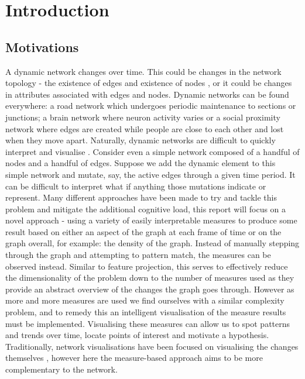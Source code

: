 
\chapter{Introduction}
\label{chap:introduction}
\ifpdf
    \graphicspath{{Introduction/Figures/PNG/}{Introduction/Figures/PDF/}{Introduction/Figures/}}
\else
    \graphicspath{{Introduction/Figures/EPS/}{Introduction/Figures/}}
\fi




\section{Motivations}
\label{motivations}
A dynamic network changes over time. This could be changes in the network topology - the existence of edges and existence of nodes \cite{itdn}, or it could be changes in attributes associated with edges and nodes. Dynamic networks can be found everywhere: a road network which undergoes periodic maintenance to sections or junctions; a brain network where neuron activity varies or a social proximity network where edges are created while people are close to each other and lost when they move apart.
Naturally, dynamic networks are difficult to quickly interpret and visualise \cite{iddps}. Consider even a simple network composed of a handful of nodes and a handful of edges. Suppose we add the dynamic element to this simple network and mutate, say, the active edges through a given time period. It can be difficult to interpret what if anything those mutations indicate or represent. Many different approaches have been made to try and tackle this problem and mitigate the additional cognitive load, this report will focus on a novel approach - using a variety of easily interpretable measures to produce some result based on either an aspect of the graph at each frame of time or on the graph overall, for example: the density of the graph. Instead of manually stepping through the graph and attempting to pattern match, the measures can be observed instead. Similar to feature projection, this serves to effectively reduce the dimensionality \cite{wikidimred} of the problem down to the number of measures used as they provide an abstract overview of the changes the graph goes through. However as more and more measures are used we find ourselves with a similar complexity problem, and to remedy this an intelligent visualisation of the measure results must be implemented. Visualising these measures can allow us to spot patterns and trends over time, locate points of interest and motivate a hypothesis. Traditionally, network visualisations have been focused on visualising the changes themselves \cite{tsotaivg}, however here the measure-based approach aims to be more complementary to the network.

